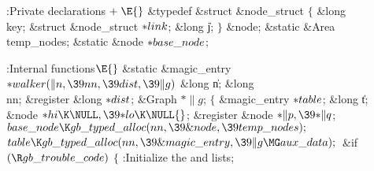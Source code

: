 \Y\B\4:Private declarations\X${}\mathrel+\E{}$\6
\&{typedef} \&{struct} \&{node\_struct} ${}\{{}$\1\6
\&{long} \\{key};\6
\&{struct} \&{node\_struct} ${}{*}\\{link}{}$;\6
\&{long} \|j;\2\6
${}\}{}$ \&{node};\6
\&{static} \&{Area} \\{temp\_nodes};\6
\&{static} \&{node} ${}{*}\\{base\_node}{}$;%
\par
\fi

\B{}:Internal functions\X${}\E{}$\6
\1\1\&{static} \&{magic\_entry} ${}{*}\\{walker}(\|n,\39\\{nn},\39\\{dist},\39%
\|g){}$\6
\&{long} \|n;\6
\&{long} \\{nn};\6
\&{register} \&{long} ${}{*}\\{dist}{}$;\6
\&{Graph} ${}{*}\|g{}$;%
\2\2\6
${}\{{}$\5
\1\&{magic\_entry} ${}{*}\\{table}{}$;\6
\&{long} \|t;\6
\&{node} ${}{*}\\{hi}\K\NULL,\39{*}\\{lo}\K\NULL{}$;\6
\&{register} \&{node} ${}{*}\|p,\39{*}\|q{}$;\7
${}\\{base\_node}\K\\{gb\_typed\_alloc}(\\{nn},\39\&{node},\39\\{temp%
\_nodes});{}$\6
${}\\{table}\K\\{gb\_typed\_alloc}(\\{nn},\39\&{magic\_entry},\39\|g\MG\\{aux%
\_data});{}$\6
\&{if} ${}(\R\\{gb\_trouble\_code}){}$\5
${}\{{}$\1\6
:Initialize the  and  lists\X;\6

